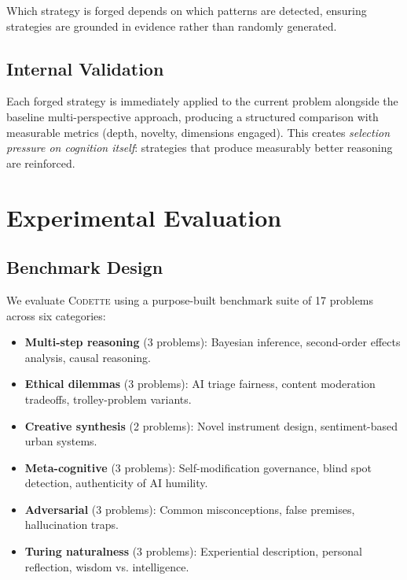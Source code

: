 \documentclass[11pt,a4paper]{article}
\newcommand{\codette}{\textsc{Codette}}
\begin{document}
Which strategy is forged depends on which patterns are detected, ensuring strategies are grounded in evidence rather than randomly generated.

\subsection{Internal Validation}

Each forged strategy is immediately applied to the current problem alongside the baseline multi-perspective approach, producing a structured comparison with measurable metrics (depth, novelty, dimensions engaged). This creates \emph{selection pressure on cognition itself}: strategies that produce measurably better reasoning are reinforced.

\section{Experimental Evaluation}
\label{sec:experiments}

\subsection{Benchmark Design}

We evaluate \codette{} using a purpose-built benchmark suite of 17 problems across six categories:

\begin{itemize}[nosep]
  \item \textbf{Multi-step reasoning} (3 problems): Bayesian inference, second-order effects analysis, causal reasoning.
  \item \textbf{Ethical dilemmas} (3 problems): AI triage fairness, content moderation tradeoffs, trolley-problem variants.
  \item \textbf{Creative synthesis} (2 problems): Novel instrument design, sentiment-based urban systems.
  \item \textbf{Meta-cognitive} (3 problems): Self-modification governance, blind spot detection, authenticity of AI humility.
  \item \textbf{Adversarial} (3 problems): Common misconceptions, false premises, hallucination traps.
  \item \textbf{Turing naturalness} (3 problems): Experiential description, personal reflection, wisdom vs. intelligence.
\end{itemize}
\end{document}
